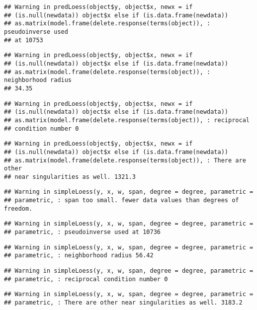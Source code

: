 \documentclass[]{article}
\begin{document}
\begin{verbatim}
## Warning in predLoess(object$y, object$x, newx = if
## (is.null(newdata)) object$x else if (is.data.frame(newdata))
## as.matrix(model.frame(delete.response(terms(object)), : pseudoinverse used
## at 10753
\end{verbatim}

\begin{verbatim}
## Warning in predLoess(object$y, object$x, newx = if
## (is.null(newdata)) object$x else if (is.data.frame(newdata))
## as.matrix(model.frame(delete.response(terms(object)), : neighborhood radius
## 34.35
\end{verbatim}

\begin{verbatim}
## Warning in predLoess(object$y, object$x, newx = if
## (is.null(newdata)) object$x else if (is.data.frame(newdata))
## as.matrix(model.frame(delete.response(terms(object)), : reciprocal
## condition number 0
\end{verbatim}

\begin{verbatim}
## Warning in predLoess(object$y, object$x, newx = if
## (is.null(newdata)) object$x else if (is.data.frame(newdata))
## as.matrix(model.frame(delete.response(terms(object)), : There are other
## near singularities as well. 1321.3
\end{verbatim}

\begin{verbatim}
## Warning in simpleLoess(y, x, w, span, degree = degree, parametric =
## parametric, : span too small. fewer data values than degrees of freedom.
\end{verbatim}

\begin{verbatim}
## Warning in simpleLoess(y, x, w, span, degree = degree, parametric =
## parametric, : pseudoinverse used at 10736
\end{verbatim}

\begin{verbatim}
## Warning in simpleLoess(y, x, w, span, degree = degree, parametric =
## parametric, : neighborhood radius 56.42
\end{verbatim}

\begin{verbatim}
## Warning in simpleLoess(y, x, w, span, degree = degree, parametric =
## parametric, : reciprocal condition number 0
\end{verbatim}

\begin{verbatim}
## Warning in simpleLoess(y, x, w, span, degree = degree, parametric =
## parametric, : There are other near singularities as well. 3183.2
\end{verbatim}
\end{document}
